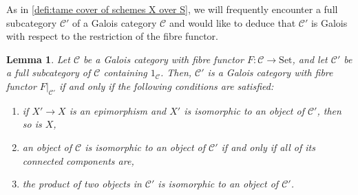 \documentclass[a4paper,twoside,11pt,reqno]{amsart}
\newcommand{\cC}{{\mathcal C}}
\newtheorem{lem}[thm]{Lemma}
\theoremstyle{definition}
\numberwithin{equation}{subsection}
\begin{document}
As in \cref{defi:tame cover of schemes X over S}, we will frequently encounter a full subcategory $\cC'$ of a Galois category $\cC$ and would like to deduce that $\cC'$ is Galois with respect to the restriction of the fibre functor. 

\begin{lem} 
\label{lem:Galois-subcategory-criterion} 
    Let $\cC$ be a Galois category with fibre functor $F \colon \cC\to \mathrm{Set}$, and let $\cC'$ be a full
    subcategory of $\cC$ containing $1_{\cC}$. Then, $\cC'$ is a Galois category with fibre functor $F|_{\cC'}$ if and only if the following conditions are satisfied:
    \begin{enumerate}[label=(\roman*)]
        \item 
        \label{lemitem:fullGalCat1}
        if $X'\to X$ is an epimorphism and $X'$ is isomorphic to an object of $\cC'$, then so is $X$,
        \item 
        \label{lemitem:fullGalCat2}
        an object of $\cC$ is isomorphic to an object of  $\cC'$ if and only if all of its connected components are,
        \item 
        \label{lemitem:fullGalCat3}
        the product of two objects in $\cC'$ is isomorphic to an object of $\cC'$.
    \end{enumerate}
\end{lem}
\end{document}
